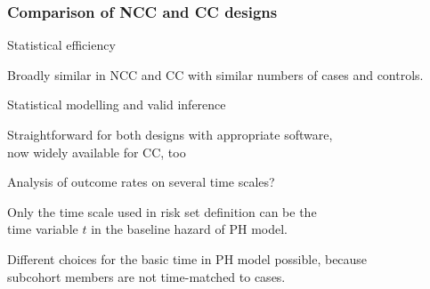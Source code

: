 \documentclass[12pt,dvipsnames,t,handout%
,aspectratio=169%
]{beamer}
\begin{document}

\begin{frame}
\frametitle{Comparison of NCC and CC designs}

\pause
\bi
\item Statistical efficiency
\bi
\item[ ] Broadly similar in NCC
and CC with similar numbers of cases and controls.
\ei
\pause
\item Statistical modelling and valid inference \pause
\bi
\item[ ] Straightforward for both designs with appropriate software, \\ 
now  widely available for CC, too 
 \ei
 \pause
 \item Analysis of outcome rates on several time scales?
 \pause
 \bi
 \item[NCC:] Only the time scale used in risk set definition
 can be the \\ time variable $t$ in the baseline hazard 
 of PH model.\pause\medskip
 \item[CC:] Different choices for the basic time  in
    PH model possible, because \\ subcohort members are
    not time-matched to cases. 
 \ei
 \ei
 \end{frame}
 
\end{document}
